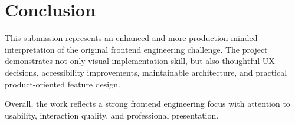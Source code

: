 \documentclass[11pt,a4paper]{article}
\begin{document}
\section{Conclusion}

This submission represents an enhanced and more production-minded interpretation of the original
frontend engineering challenge. The project demonstrates not only visual implementation skill,
but also thoughtful UX decisions, accessibility improvements, maintainable architecture, and
practical product-oriented feature design.

Overall, the work reflects a strong frontend engineering focus with attention to usability,
interaction quality, and professional presentation.
\end{document}

